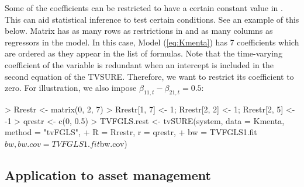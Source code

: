 Some of the coefficients can be restricted to have a certain constant value in . This can aid statistical inference to test certain conditions. See an example of this below. Matrix  has as many rows as restrictions in  and as many columns as regressors in the model. In this case, Model (\ref{eq:Kmenta}) has 7 coefficients which are ordered as they appear in the list of formulas. Note that the time-varying coefficient of the variable  is redundant when an intercept is included in the second equation of the TVSURE. Therefore, we want to restrict its coefficient to zero. For illustration, we also impose $\beta_{11, t} - \beta_{21, t} = 0.5$:


\begin{Schunk}
\begin{Sinput}
> Rrestr <- matrix(0, 2, 7)
> Rrestr[1, 7] <- 1; Rrestr[2, 2] <- 1; Rrestr[2, 5] <- -1
> qrestr <- c(0, 0.5)
> TVFGLS.rest <- tvSURE(system, data = Kmenta, method = "tvFGLS",
+                       R = Rrestr, r = qrestr, 
+                       bw = TVFGLS1.fit$bw, bw.cov = TVFGLS1.fit$bw.cov)
\end{Sinput}
\end{Schunk}


\subsection{Application to asset management}

